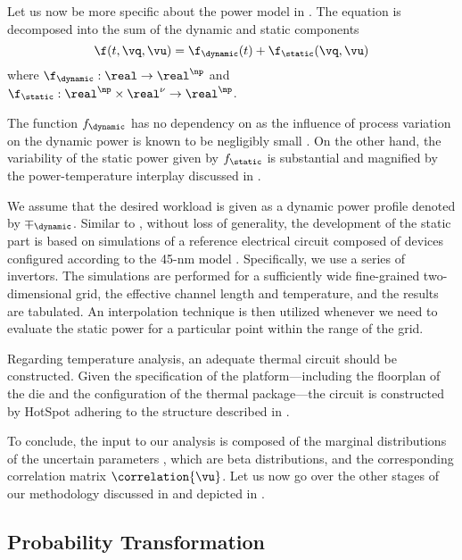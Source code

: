Let us now be more specific about the power model in .
The equation is decomposed into the sum of the dynamic and static components
\[
  \f(t, \vq, \vu) = \f_\dynamic(t) + \f_\static(\vq, \vu)
\]
where $\f_\dynamic: \real \to \real^\np$ and $\f_\static: \real^\np \times
\real^\nu \to \real^\np$.

\begin{remark}
The function $f_\dynamic$ has no dependency on \vu as the influence of process
variation on the dynamic power is known to be negligibly small
\cite{srivastava2010}. On the other hand, the variability of the static power
given by $f_\static$ is substantial and magnified by the power-temperature
interplay discussed in .
\end{remark}

We assume that the desired workload is given as a dynamic power profile denoted
by $\mp_\dynamic$. Similar to , without loss of
generality, the development of the static part is based on 
simulations of a reference electrical circuit composed of  devices
\cite{bsim} configured according to the 45-nm   model \cite{ptm}.
Specifically, we use a series of  invertors. The simulations are
performed for a sufficiently wide fine-grained two-dimensional grid, the
effective channel length and temperature, and the results are tabulated. An
interpolation technique is then utilized whenever we need to evaluate the static
power for a particular point within the range of the grid.

Regarding temperature analysis, an adequate thermal  circuit should be
constructed. Given the specification of the platform---including the floorplan
of the die and the configuration of the thermal package---the circuit is
constructed by HotSpot \cite{skadron2003} adhering to the structure described in
.

To conclude, the input to our analysis is composed of the marginal distributions
of the uncertain parameters \vu, which are beta distributions, and the
corresponding correlation matrix $\correlation{\vu}$. Let us now go over the
other stages of our methodology discussed in 
and depicted in .

\subsection{Probability Transformation}

